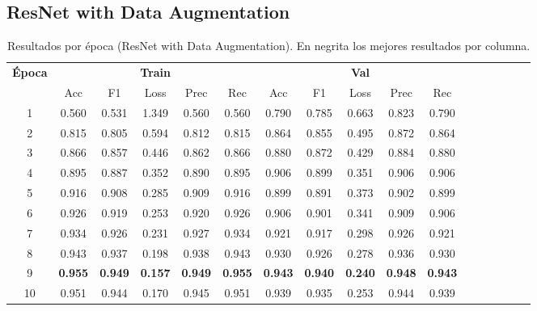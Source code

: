\documentclass[conference]{IEEEtran}
\begin{document}
\subsection{ResNet with Data Augmentation}
\begin{table}[h]
\scriptsize
\caption{Resultados por época (ResNet with Data Augmentation). En negrita los mejores resultados por columna.}
\centering
\begin{tabular}{|c|c|c|c|c|c|c|c|c|c|c|c|c|c|c|c|c|}
\hline
\textbf{Época} & \multicolumn{5}{c|}{\textbf{Train}} & \multicolumn{5}{c|}{\textbf{Val}} \\
\cline{2-11}
 & Acc & F1 & Loss & Prec & Rec & Acc & F1 & Loss & Prec & Rec \\
\hline
1 & 0.560 & 0.531 & 1.349 & 0.560 & 0.560 & 0.790 & 0.785 & 0.663 & 0.823 & 0.790 \\
2 & 0.815 & 0.805 & 0.594 & 0.812 & 0.815 & 0.864 & 0.855 & 0.495 & 0.872 & 0.864 \\
3 & 0.866 & 0.857 & 0.446 & 0.862 & 0.866 & 0.880 & 0.872 & 0.429 & 0.884 & 0.880 \\
4 & 0.895 & 0.887 & 0.352 & 0.890 & 0.895 & 0.906 & 0.899 & 0.351 & 0.906 & 0.906 \\
5 & 0.916 & 0.908 & 0.285 & 0.909 & 0.916 & 0.899 & 0.891 & 0.373 & 0.902 & 0.899 \\
6 & 0.926 & 0.919 & 0.253 & 0.920 & 0.926 & 0.906 & 0.901 & 0.341 & 0.909 & 0.906 \\
7 & 0.934 & 0.926 & 0.231 & 0.927 & 0.934 & 0.921 & 0.917 & 0.298 & 0.926 & 0.921 \\
8 & 0.943 & 0.937 & 0.198 & 0.938 & 0.943 & 0.930 & 0.926 & 0.278 & 0.936 & 0.930 \\
9 & \textbf{0.955} & \textbf{0.949} & \textbf{0.157} & \textbf{0.949} & \textbf{0.955} & \textbf{0.943} & \textbf{0.940} & \textbf{0.240} & \textbf{0.948} & \textbf{0.943} \\
10 & 0.951 & 0.944 & 0.170 & 0.945 & 0.951 & 0.939 & 0.935 & 0.253 & 0.944 & 0.939 \\
\hline
\end{tabular}
\label{tab:resnet_aug}
\end{table}
\end{document}
